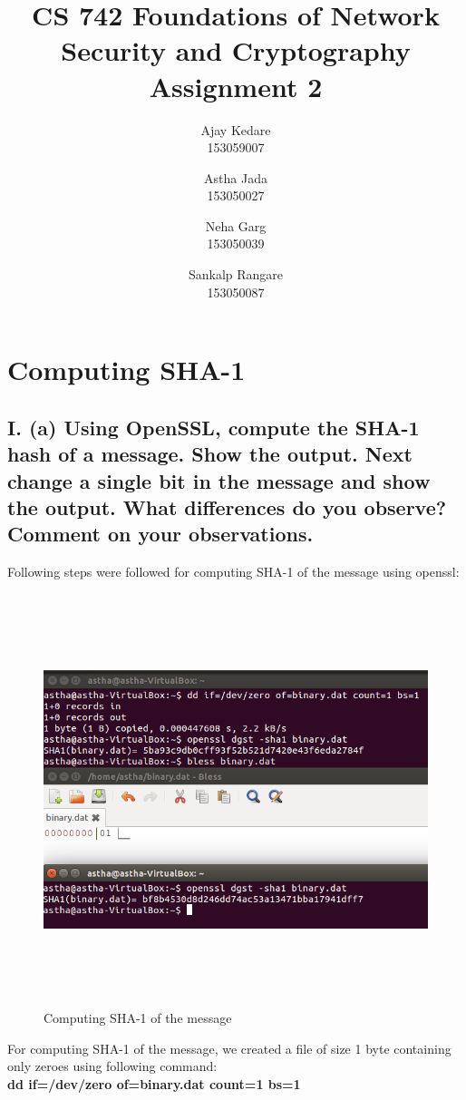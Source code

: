 \documentclass{article}
\title{CS 742 Foundations of Network Security and Cryptography \\ Assignment 2}
\author{
  Ajay Kedare \\
  153059007
  \and
  Astha Jada \\
  153050027
  \and
  Neha Garg \\
  153050039
  \and
  Sankalp Rangare \\
  153050087
}
\begin{document}
\maketitle
\clearpage

\section*{Computing SHA-1}
\subsection*{I. (a) Using OpenSSL, compute the SHA-1 hash of a message. Show the output.
Next change a single bit in the message and show the output. What differences
do you observe? Comment on your observations.}

Following steps were followed for computing SHA-1 of the message using openssl:\\

	\begin{figure}[htb]
	    \begin{center}
		\includegraphics[width=15cm,height=12cm]{question1.png}
		\caption{Computing SHA-1 of the message}
	    \end{center}
	\end{figure}

\noindent For computing SHA-1 of the message, we created a file of size 1 byte containing only zeroes using following command:\\
\textbf{ dd if=/dev/zero of=binary.dat count=1 bs=1}\\
\end{document}
